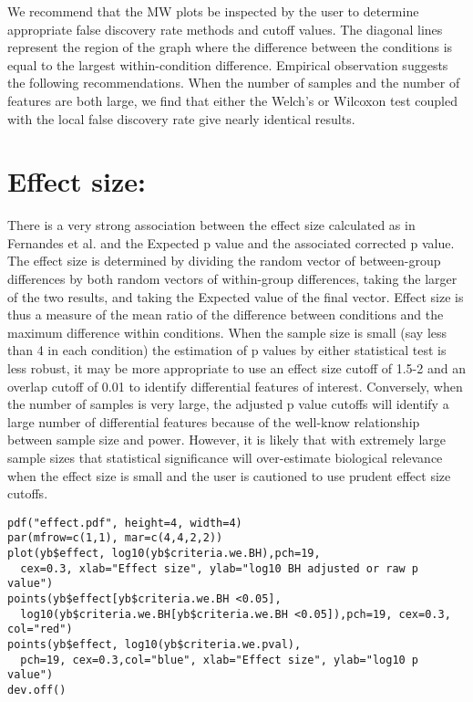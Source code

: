 \documentclass[11pt]{amsart}
\begin{document}
We recommend that the MW plots  be inspected by the user to determine appropriate false discovery rate methods and cutoff values. The diagonal lines represent the region of the graph where the difference between the conditions is equal to the largest within-condition difference\cite{fernandes:2013}. Empirical observation suggests the following recommendations. When the number of samples and the number of features are both large, we find that either the Welch's or Wilcoxon test coupled with the local false discovery rate give nearly identical results. 

\section*{Effect size:} There is a very strong association between the effect size calculated as in Fernandes et al.\cite{fernandes:2013} and the Expected p value and the associated corrected p value. The effect size is determined by dividing the random vector of between-group differences by both random vectors of within-group differences, taking the larger of the two results, and taking the Expected value of the final vector. Effect size is thus a measure of the mean ratio of the difference between conditions and the maximum difference within conditions. When the sample size is small (say less than 4 in each condition)  the estimation of p values by either statistical test is less robust, it may be more appropriate to use an effect size cutoff of 1.5-2 and an overlap cutoff of 0.01 to identify differential features of interest\cite{fernandes:2013}. Conversely, when the number of samples is very large, the adjusted p value cutoffs will identify a large number of differential features because of the well-know relationship between sample size and power. However, it is likely that with extremely large sample sizes that statistical significance will over-estimate biological relevance when the effect size is small and the user is cautioned to use prudent effect size cutoffs\cite{Nakagawa:2007}.\
\begin{verbatim}pdf("effect.pdf", height=4, width=4)
par(mfrow=c(1,1), mar=c(4,4,2,2))
plot(yb$effect, log10(yb$criteria.we.BH),pch=19, 
  cex=0.3, xlab="Effect size", ylab="log10 BH adjusted or raw p value")
points(yb$effect[yb$criteria.we.BH <0.05], 
  log10(yb$criteria.we.BH[yb$criteria.we.BH <0.05]),pch=19, cex=0.3, col="red")
points(yb$effect, log10(yb$criteria.we.pval), 
  pch=19, cex=0.3,col="blue", xlab="Effect size", ylab="log10 p value")
dev.off()
\end{verbatim}
\end{document}
